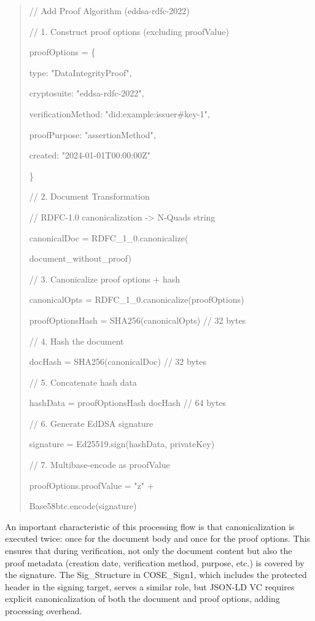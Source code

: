 \begin{quote}
// Add Proof Algorithm (eddsa-rdfc-2022)

// 1. Construct proof options (excluding proofValue)

proofOptions = \{

type: "DataIntegrityProof",

cryptosuite: "eddsa-rdfc-2022",

verificationMethod: "did:example:issuer\#key-1",

proofPurpose: "assertionMethod",

created: "2024-01-01T00:00:00Z"

\}

// 2. Document Transformation

// RDFC-1.0 canonicalization -\textgreater{} N-Quads string

canonicalDoc = RDFC\_1\_0.canonicalize(

document\_without\_proof)

// 3. Canonicalize proof options + hash

canonicalOpts = RDFC\_1\_0.canonicalize(proofOptions)

proofOptionsHash = SHA256(canonicalOpts) // 32 bytes

// 4. Hash the document

docHash = SHA256(canonicalDoc) // 32 bytes

// 5. Concatenate hash data

hashData = proofOptionsHash \textbar\textbar{} docHash // 64 bytes

// 6. Generate EdDSA signature

signature = Ed25519.sign(hashData, privateKey)

// 7. Multibase-encode as proofValue

proofOptions.proofValue = "z" +

Base58btc.encode(signature)
\end{quote}

An important characteristic of this processing flow is that canonicalization is executed twice: once for the document body and once for the proof options. This ensures that during verification, not only the document content but also the proof metadata (creation date, verification method, purpose, etc.) is covered by the signature. The Sig\_Structure in COSE\_Sign1, which includes the protected header in the signing target, serves a similar role, but JSON-LD VC requires explicit canonicalization of both the document and proof options, adding processing overhead.

